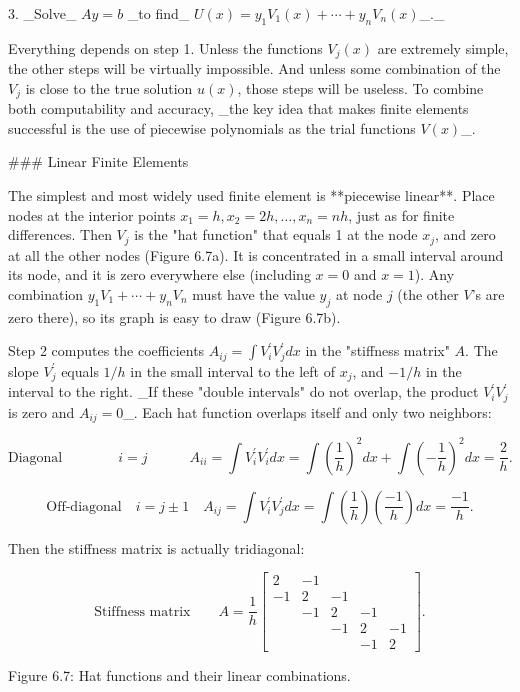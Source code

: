 3. _Solve_ \(Ay=b\) _to find_ \(U(x)=y_{1}V_{1}(x)+\cdots+y_{n}V_{n}(x)\)_._

Everything depends on step 1. Unless the functions \(V_{j}(x)\) are extremely simple, the other steps will be virtually impossible. And unless some combination of the \(V_{j}\) is close to the true solution \(u(x)\), those steps will be useless. To combine both computability and accuracy, _the key idea that makes finite elements successful is the use of piecewise polynomials as the trial functions \(V(x)\)_.

### Linear Finite Elements

The simplest and most widely used finite element is **piecewise linear**. Place nodes at the interior points \(x_{1}=h,x_{2}=2h,\ldots,x_{n}=nh\), just as for finite differences. Then \(V_{j}\) is the "hat function" that equals 1 at the node \(x_{j}\), and zero at all the other nodes (Figure 6.7a). It is concentrated in a small interval around its node, and it is zero everywhere else (including \(x=0\) and \(x=1\)). Any combination \(y_{1}V_{1}+\cdots+y_{n}V_{n}\) must have the value \(y_{j}\) at node \(j\) (the other \(V\)'s are zero there), so its graph is easy to draw (Figure 6.7b).

Step 2 computes the coefficients \(A_{ij}=\int V_{i}^{\prime}V_{j}^{\prime}dx\) in the "stiffness matrix" \(A\). The slope \(V_{j}^{\prime}\) equals \(1/h\) in the small interval to the left of \(x_{j}\), and \(-1/h\) in the interval to the right. _If these "double intervals" do not overlap, the product \(V_{i}^{\prime}V_{j}^{\prime}\) is zero and \(A_{ij}=0\)_. Each hat function overlaps itself and only two neighbors:

\[\text{Diagonal}\qquad\qquad i=j\qquad\quad A_{ii}=\int V_{i}^{\prime}V_{i}^{ \prime}dx=\int\left(\frac{1}{h}\right)^{2}dx+\int\left(-\frac{1}{h}\right)^{2 }dx=\frac{2}{h}.\]

\[\text{Off-diagonal}\quad i=j\pm 1\quad A_{ij}=\int V_{i}^{\prime}V_{j}^{ \prime}dx=\int\left(\frac{1}{h}\right)\left(\frac{-1}{h}\right)dx=\frac{-1}{h}.\]

Then the stiffness matrix is actually tridiagonal:

\[\text{Stiffness matrix}\qquad A=\frac{1}{h}\left[\begin{matrix}2&-1&&&\\ -1&2&-1&&\\ &-1&2&-1&\\ &&-1&2&-1\\ &&&-1&2\end{matrix}\right].\]

Figure 6.7: Hat functions and their linear combinations.

 